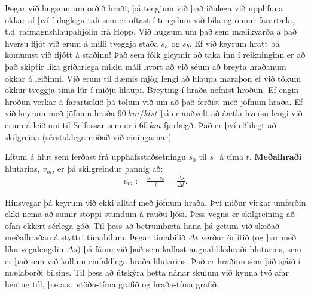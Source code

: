 Þegar við hugsum um orðið hraði, þá tengjum við það iðulega við upplifuna okkar af því í daglegu tali sem er oftast í tengslum við bíla og önnur farartæki, t.d~rafmagnshlaupahjólin frá Hopp. Við hugsum um það sem mælikvarða á það hversu fljót við erum á milli tveggja staða $s_a$ og $s_b$. Ef við keyrum hratt þá komumst við fljótt á staðinn! Það sem fólk gleymir að taka inn í reikninginn er að það skiptir líka gríðarlega miklu máli hvort að við séum að breyta hraðanum okkar á leiðinni. Við erum til dæmis mjög lengi að hlaupa maraþon ef við tökum okkur tveggja tíma lúr í miðju hlaupi. Breyting í hraða nefnist hröðun. Ef engin hröðun verkar á farartækið þá tölum við um að það ferðist með jöfnum hraða. Ef við keyrum með jöfnum hraða $\SI{90}{km/klst}$ þá er auðvelt að áætla hversu lengi við erum á leiðinni til Selfossar sem er í $\SI{60}{km}$ fjarlægð. Það er því eðlilegt að skilgreina (sérstaklega miðað við einingarnar)
\begin{tcolorbox}
\begin{definition}
Lítum á hlut sem ferðast frá upphafsstaðsetningu $s_0$ til $s_1$ á tíma $t$. \textbf{Meðalhraði} hlutarins, $v_m$, er þá skilgreindur þannig að:
\begin{align*}
    v_m := \frac{s_1 - s_0}{t} = \frac{\Delta s}{\Delta t}.
\end{align*}
\end{definition}
\end{tcolorbox}

Hinsvegar þá keyrum við ekki alltaf með jöfnum hraða. Því miður virkar umferðin ekki nema að sumir stoppi stundum á rauðu ljósi. Þess vegna er skilgreining að ofan ekkert sérlega góð. Til þess að betrumbæta hana þá getum við skoðað meðalhraðan á styttri tímabilum. Þegar tímabilið $\Delta t$ verður örlítið (og þar með líka vegalengdin $\Delta s$) þá fáum við það sem kallast augnablikshraði hlutarins, sem er það sem við köllum einfaldlega hraða hlutarins. Það er hraðinn sem þið sjáið í mælaborði bílsins. Til þess að útskýra þetta nánar skulum við kynna tvö afar hentug tól, þ.e.a.s.~stöðu-tíma grafið og hraða-tíma grafið.



